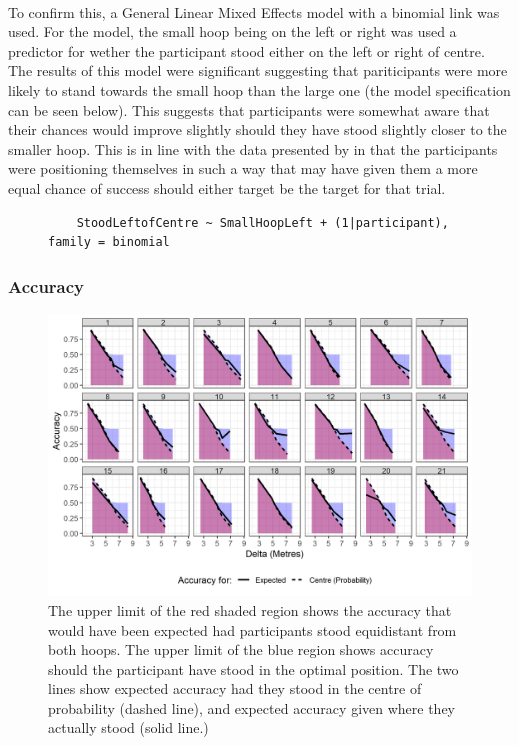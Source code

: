 \documentclass[12pt]{article}
\begin{document}
\paragraph{} To confirm this, a General Linear Mixed Effects model with a binomial link was used. For the model, the small hoop being on the left or right was used a predictor for wether the participant stood either on the left or right of centre. The results of this model were significant suggesting that pariticipants were more likely to stand towards the small hoop than the large one (the model specification can be seen below). This suggests that participants were somewhat aware that their chances would improve slightly should they have stood slightly closer to the smaller hoop. This is in line with the data presented by \cite{CHAPMAN2010168} in that the participants were positioning themselves in such a way that may have given them a more equal chance of success should either target be the target for that trial.

\begin{figure}[!ht]
	\centering
	\begin{BVerbatim}
	StoodLeftofCentre ~ SmallHoopLeft + (1|participant), family = binomial
	\end{BVerbatim}
\end{figure}

\subsubsection*{Accuracy}
\begin{figure}[ht!]%
	\includegraphics[scale=0.9]{Figures/Experiment_3_Hoop_size/Accuracyshaded_regions}
	\centering
	\captionsetup{justification=centering}
	\caption{The upper limit of the red shaded region shows the accuracy that would have been expected had participants stood equidistant from both hoops. The upper limit of the blue region shows accuracy should the participant have stood in the optimal position. The two lines show expected accuracy had they stood in the centre of probability (dashed line), and expected accuracy given where they actually stood (solid line.)}
	\label{fig:Session2-Hoopsizes-Accuracy}
\end{figure}
\end{document}
